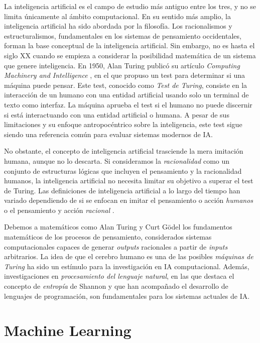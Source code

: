 La inteligencia artificial es el campo de estudio más antiguo entre los tres, y no se limita únicamente al ámbito computacional. En su sentido más amplio, la inteligencia artificial ha sido abordada por la filosofía. Los racionalismos y estructuralismos, fundamentales en los sistemas de pensamiento occidentales, forman la base conceptual de la inteligencia artificial. Sin embargo, no es hasta el siglo XX cuando se empieza a considerar la posibilidad matemática de un sistema que genere inteligencia. En 1950, Alan Turing publicó su artículo \textit{Computing Machinery and Intelligence} \citep{alan1950a}, en el que propuso un test para determinar si una máquina puede pensar. Este test, conocido como \textit{Test de Turing}, consiste en la interacción de un humano con una entidad artificial usando solo un terminal de texto como interfaz. La máquina aprueba el test si el humano no puede discernir si está interactuando con una entidad artificial o humana. A pesar de sus limitaciones y su enfoque antropocéntrico sobre la inteligencia, este test sigue siendo una referencia común para evaluar sistemas modernos de IA.

No obstante, el concepto de inteligencia artificial trasciende la mera imitación humana, aunque no lo descarta. Si consideramos la \textit{racionalidad} como un conjunto de estructuras lógicas que incluyen el pensamiento y la racionalidad humanos, la inteligencia artificial no necesita limitar su objetivo a superar el test de Turing. Las definiciones de inteligencia artificial a lo largo del tiempo han variado dependiendo de si se enfocan en imitar el pensamiento o acción \textit{humanos} o el pensamiento y acción \textit{racional} \citep{RussellStuartJ2021AI:A}.

Debemos a matemáticos como Alan Turing y Curt Gödel los fundamentos matemáticos de los procesos de pensamiento, considerados sistemas computacionales capaces de generar \textit{outputs} racionales a partir de \textit{inputs} arbitrarios. La idea de que el cerebro humano es una de las posibles \textit{máquinas de Turing} \citep{penroseNuevaMenteEmperador2015} ha sido un estímulo para la investigación en IA computacional. Además, investigaciones en \textit{procesamiento del lenguaje natural}, en las que destaca el concepto de \textit{entropía} de Shannon \citep{shannon1951prediction} y que han acompañado el desarrollo de lenguajes de programación, son fundamentales para los sistemas actuales de IA.


\section{Machine Learning}

